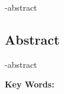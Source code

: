 \latinkeywords{}

\en-abstract{
}

\newpage
\thispagestyle{empty}
\begin{latin}
\section*{\LARGE\centering Abstract}

\een-abstract

\vspace*{.5cm}
{\large\textbf{Key Words:}}\par
\vspace*{.5cm}
\elatinkeywords
\end{latin}
